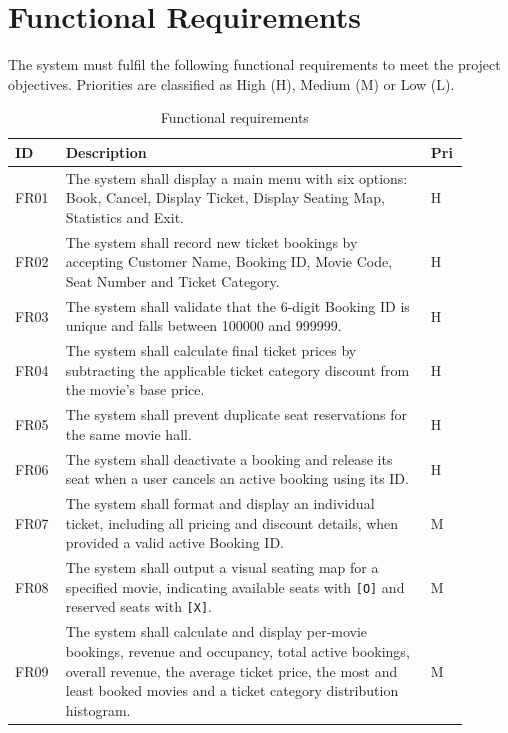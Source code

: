 \documentclass{thesis-library}
\newcommand{\tablefont}{\footnotesize\setstretch{1.15}\hyphenpenalty=10000\relax}
\begin{document}

\section{Functional Requirements}

The system must fulfil the following functional requirements to meet the project objectives. Priorities are classified as High (H), Medium (M) or Low (L).

\begin{table}[H]
\centering
\caption{Functional requirements}
\label{tab:func-req}
\tablefont
\begin{tabular}{|>{\raggedright\arraybackslash}p{0.1\linewidth}|>{\raggedright\arraybackslash}p{0.75\linewidth}|>{\raggedright\arraybackslash}p{0.05\linewidth}|}
\hline
\textbf{ID} & \textbf{Description} & \textbf{Pri} \\
\hline
FR01 & The system shall display a main menu with six options: Book, Cancel, Display Ticket, Display Seating Map, Statistics and Exit.& H \\
\hline
FR02 & The system shall record new ticket bookings by accepting Customer Name, Booking ID, Movie Code, Seat Number and Ticket Category. & H \\
\hline
FR03 & The system shall validate that the 6-digit Booking ID is unique and falls between 100000 and 999999. & H \\
\hline
FR04 & The system shall calculate final ticket prices by subtracting the applicable ticket category discount from the movie's base price. & H \\
\hline
FR05 & The system shall prevent duplicate seat reservations for the same movie hall. & H \\
\hline
FR06 & The system shall deactivate a booking and release its seat when a user cancels an active booking using its ID. & H \\
\hline
FR07 & The system shall format and display an individual ticket, including all pricing and discount details, when provided a valid active Booking ID. & M \\
\hline
FR08 & The system shall output a visual seating map for a specified movie, indicating available seats with \texttt{[O]} and reserved seats with \texttt{[X]}. & M \\
\hline
FR09 & The system shall calculate and display per-movie bookings, revenue and occupancy, total active bookings, overall revenue, the average ticket price, the most and least booked movies and a ticket category distribution histogram. & M \\

\end{tabular}
\end{table}
\end{document}
